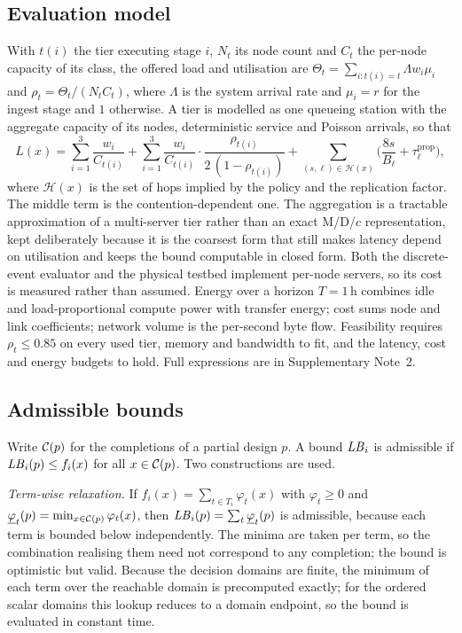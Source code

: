 \subsection*{Evaluation model}
With $t(i)$ the tier executing stage $i$, $N_t$ its node count and $C_t$ the per-node
capacity of its class, the offered load and utilisation are
$\Theta_t=\sum_{i:t(i)=t}\Lambda w_i\mu_i$ and $\rho_t=\Theta_t/(N_tC_t)$, where
$\Lambda$ is the system arrival rate and $\mu_i=r$ for the ingest stage and $1$
otherwise. A tier is modelled as one queueing station with the aggregate capacity of its
nodes, deterministic service and Poisson arrivals, so that
\begin{equation}
L(x)=\sum_{i=1}^{3}\frac{w_i}{C_{t(i)}}
+\sum_{i=1}^{3}\frac{w_i}{C_{t(i)}}\cdot\frac{\rho_{t(i)}}{2\,(1-\rho_{t(i)})}
+\sum_{(s,\ell)\in\mathcal{H}(x)}\Big(\frac{8s}{B_\ell}+\tau^{\mathrm{prop}}_\ell\Big),
\label{eq:ce:latency}
\end{equation}
where $\mathcal{H}(x)$ is the set of hops implied by the policy and the replication
factor. The middle term is the contention-dependent one. The aggregation is a tractable approximation of a multi-server tier rather than an exact
M/D/$c$ representation, kept deliberately because it is the coarsest form that still makes
latency depend on utilisation and keeps the bound computable in closed form. Both the discrete-event
evaluator and the physical testbed implement per-node servers, so its cost is measured
rather than assumed. Energy over a horizon $T=1$\,h combines idle and load-proportional
compute power with transfer energy; cost sums node and link coefficients; network volume
is the per-second byte flow. Feasibility requires $\rho_t\le0.85$ on every used tier,
memory and bandwidth to fit, and the latency, cost and energy budgets to hold. Full
expressions are in Supplementary Note~2.

\subsection*{Admissible bounds}
Write $\mathcal{C}(p)$ for the completions of a partial design $p$. A bound $\mathit{LB}_i$ is admissible
if $\mathit{LB}_i(p)\le f_i(x)$ for all $x\in\mathcal{C}(p)$. Two constructions are used.

\emph{Term-wise relaxation.} If $f_i(x)=\sum_{t\in T_i}\varphi_t(x)$ with
$\varphi_t\ge0$ and $\underline{\varphi}_t(p)=\min_{x\in\mathcal{C}(p)}\varphi_t(x)$, then
$\mathit{LB}_i(p)=\sum_t\underline{\varphi}_t(p)$ is admissible, because each term is bounded
below independently. The minima are taken per term, so the combination realising them
need not correspond to any completion; the bound is optimistic but valid. Because the decision domains are finite, the minimum of each term over the reachable
domain is precomputed exactly; for the ordered scalar domains this lookup reduces to a
domain endpoint, so the bound is evaluated in constant time.

